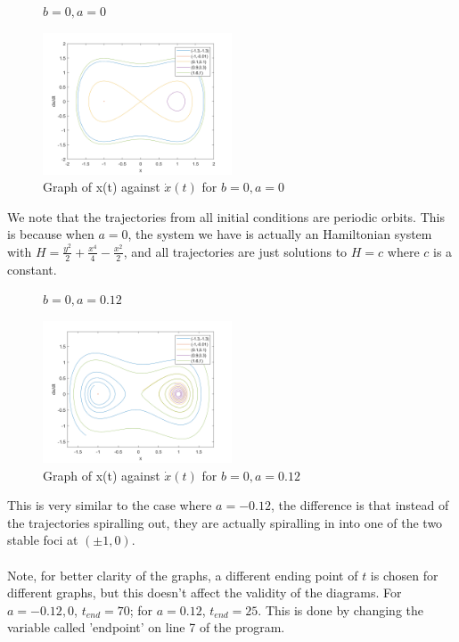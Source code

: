\documentclass[10pt]{article}
\begin{document}
\begin{figure}[ht]
\centering
\textbf{$b=0,a=0$}\par
\includegraphics[width=0.5\textwidth]{Files/q1,a=0.png}
\caption{Graph of x(t) against $\dot{x}(t)$ for $b=0, a=0$}
\end{figure}
\noindent We note that the trajectories from all initial conditions are periodic orbits. This is because when $a=0$, the system we have is actually an Hamiltonian system with $H=\frac{y^2}{2}+\frac{x^4}{4}-\frac{x^2}{2}$, and all trajectories are just solutions to $H=c$ where $c$ is a constant.

\newpage
\begin{figure}[H]
\centering
\textbf{$b=0,a=0.12$}\par
\includegraphics[width=0.5\textwidth]{Files/q1,a=012.png}
\caption{Graph of x(t) against $\dot{x}(t)$ for $b=0, a=0.12$}
\end{figure}
\noindent This is very similar to the case where $a=-0.12$, the difference is that instead of the trajectories spiralling out, they are actually spiralling in into one of the two stable foci at $(\pm1,0)$.\\\\
\noindent Note, for better clarity of the graphs, a different ending point of $t$ is chosen for different graphs, but this doesn't affect the validity of the diagrams. For $a=-0.12,0$, $t_{end}=70$; for $a=0.12$, $t_{end}=25$. This is done by changing the variable called 'endpoint' on line 7 of the program.\\ 
\end{document}

